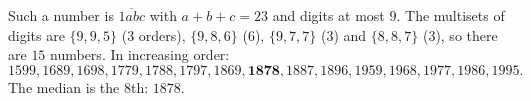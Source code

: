 Such a number is $\overline{1abc}$ with $a+b+c=23$ and digits at most $9$. The multisets of digits are $\{9,9,5\}$ ($3$ orders), $\{9,8,6\}$ ($6$), $\{9,7,7\}$ ($3$) and $\{8,8,7\}$ ($3$), so there are $15$ numbers. In increasing order:
\[
1599,1689,1698,1779,1788,1797,1869,\mathbf{1878},1887,1896,1959,1968,1977,1986,1995 .
\]
The median is the $8$th: $\boxed{1878}$.
